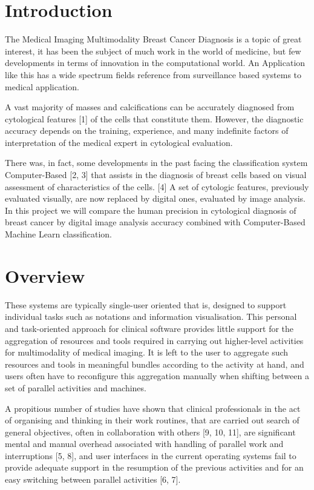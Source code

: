 \section{Introduction}

The Medical Imaging Multimodality Breast Cancer Diagnosis is a topic of great interest, it has been the subject of much work in the world of medicine, but few developments in terms of innovation in the computational world. An Application like this has a wide spectrum fields reference from surveillance based systems to medical application.

A vast majority of masses and calcifications can be accurately diagnosed from cytological features [1] of the cells that constitute them. However, the diagnostic accuracy depends on the training, experience, and many indefinite factors of interpretation of the medical expert in cytological evaluation.

There was, in fact, some developments in the past facing the classification system Computer-Based [2, 3] that assists in the diagnosis of breast cells based on visual assessment of characteristics of the cells. [4] A set of cytologic features, previously evaluated visually, are now replaced by digital ones, evaluated by image analysis. In this project we will compare the human precision in cytological diagnosis of breast cancer by digital image analysis accuracy combined with Computer-Based Machine Learn classification.

\section{Overview}

These systems are typically single-user oriented that is, designed to support individual tasks such as notations and information visualisation. This personal and task-oriented approach for clinical software provides little support for the aggregation of resources and tools required in carrying out higher-level activities for multimodality of medical imaging. It is left to the user to aggregate such resources and tools in meaningful bundles according to the activity at hand, and users often have to reconfigure this aggregation manually when shifting between a set of parallel activities and machines.

A propitious number of studies have shown that clinical professionals in the act of organising and thinking in their work routines, that are carried out search of general objectives, often in collaboration with others [9, 10, 11], are significant mental and manual overhead associated with handling of parallel work and interruptions [5, 8], and user interfaces in the current operating systems fail to provide adequate support in the resumption of the previous activities and for an easy switching between parallel activities [6, 7].

